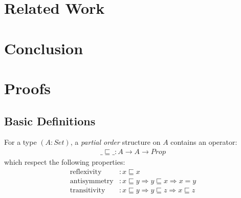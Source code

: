 \documentclass{article}
\begin{document}

\section{Related Work}
\label{RelatedWork}


\section{Conclusion}
\label{Conclusion}


\section{Proofs}
\label{section:Proofs}

\subsection{Basic Definitions}
\label{section:Proofs:BasicDefinitions}

\begin{definition}
For a type $(A : Set)$, a \emph{partial order} structure on $A$ contains an operator:
\begin{align*}
\_⊑\_ : A → A → Prop
\end{align*}
which respect the following properties:
\begin{align*}
 \operatorname{reflexivity} &: x ⊑ x                   \\
\operatorname{antisymmetry} &: x ⊑ y ⇒  y ⊑ x ⇒  x = y \\
\operatorname{transitivity} &: x ⊑ y ⇒  y ⊑ z ⇒  x ⊑ z \\
\end{align*}
\end{definition}
\end{document}
